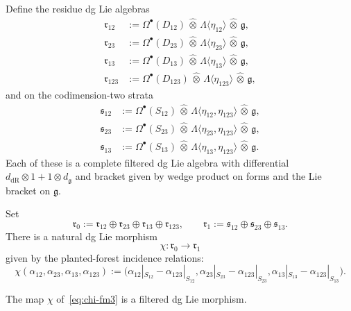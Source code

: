 Define the residue dg Lie algebras
\begin{align*}
\mathfrak{r}_{12} &:= \Omega^\bullet(D_{12})\,\widehat\otimes\,\Lambda\langle \eta_{12}\rangle\,\widehat\otimes\,\mathfrak{g},\\
\mathfrak{r}_{23} &:= \Omega^\bullet(D_{23})\,\widehat\otimes\,\Lambda\langle \eta_{23}\rangle\,\widehat\otimes\,\mathfrak{g},\\
\mathfrak{r}_{13} &:= \Omega^\bullet(D_{13})\,\widehat\otimes\,\Lambda\langle \eta_{13}\rangle\,\widehat\otimes\,\mathfrak{g},\\
\mathfrak{r}_{123} &:= \Omega^\bullet(D_{123})\,\widehat\otimes\,\Lambda\langle \eta_{123}\rangle\,\widehat\otimes\,\mathfrak{g},
\end{align*}
and on the codimension-two strata
\begin{align*}
\mathfrak{s}_{12} &:= \Omega^\bullet(S_{12})\,\widehat\otimes\,\Lambda\langle \eta_{12},\eta_{123}\rangle\,\widehat\otimes\,\mathfrak{g},\\
\mathfrak{s}_{23} &:= \Omega^\bullet(S_{23})\,\widehat\otimes\,\Lambda\langle \eta_{23},\eta_{123}\rangle\,\widehat\otimes\,\mathfrak{g},\\
\mathfrak{s}_{13} &:= \Omega^\bullet(S_{13})\,\widehat\otimes\,\Lambda\langle \eta_{13},\eta_{123}\rangle\,\widehat\otimes\,\mathfrak{g}.
\end{align*}
Each of these is a complete filtered dg Lie algebra with differential
$d_{\mathrm{dR}}\otimes 1 + 1\otimes d_{\mathfrak g}$ and bracket given by wedge
product on forms and the Lie bracket on $\mathfrak g$.

Set
\[
\mathfrak{r}_0 := \mathfrak{r}_{12}\oplus\mathfrak{r}_{23}\oplus\mathfrak{r}_{13}\oplus\mathfrak{r}_{123},
\qquad
\mathfrak{r}_1 := \mathfrak{s}_{12}\oplus\mathfrak{s}_{23}\oplus\mathfrak{s}_{13}.
\]
There is a natural dg Lie morphism
\[
\chi \colon \mathfrak{r}_0 \longrightarrow \mathfrak{r}_1
\]
given by the planted-forest incidence relations:
\begin{equation}
\label{eq:chi-fm3}
\chi(\alpha_{12},\alpha_{23},\alpha_{13},\alpha_{123})
:=
\bigl(
\alpha_{12}|_{S_{12}}-\alpha_{123}|_{S_{12}},
\alpha_{23}|_{S_{23}}-\alpha_{123}|_{S_{23}},
\alpha_{13}|_{S_{13}}-\alpha_{123}|_{S_{13}}
\bigr).
\end{equation}

\begin{lemma}
\label{lem:chi-dgla-fm3}
The map $\chi$ of~\eqref{eq:chi-fm3} is a filtered dg Lie morphism.
\end{lemma}

